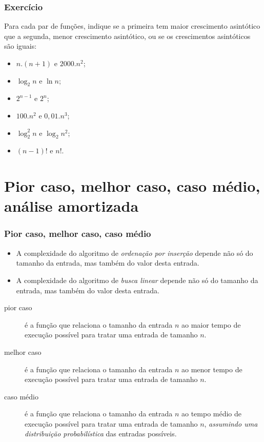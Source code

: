 \documentclass[handout]{beamer}
\begin{document}
\begin{frame}
\frametitle{Exercício}

Para cada par de funções, indique se a primeira tem maior crescimento asintótico
que a segunda, menor crescimento asintótico, ou se os crescimentos asintóticos
são iguais:
\begin{itemize}
\item $n.(n+1)$ e $2000.n^2$;
\item $\log_2 n$ e $\ln n$;
\item $2^{n-1}$ e $2^n$;
\item $100.n^2$ e $0,01.n^3$;
\item $\log_2^2 n$ e $\log_2 n^2$;
\item $(n-1)!$ e $n!$.
\end{itemize}

\end{frame}

\section{Pior caso, melhor caso, caso médio, análise amortizada}

\begin{frame}
\frametitle{Pior caso, melhor caso, caso médio}

\begin{itemize}
\item A complexidade do algoritmo de \emph{ordenação por inserção} depende não
  só do tamanho da entrada, mas também do valor desta entrada.
\item A complexidade do algoritmo de \emph{busca linear} depende não só do
  tamanho da entrada, mas também do valor desta entrada.
\end{itemize}
\pause
\begin{description}
\item[pior caso] é a função que relaciona o tamanho da entrada $n$ ao maior tempo de execução possível para tratar uma entrada de tamanho $n$.
\item[melhor caso] é a função que relaciona o tamanho da entrada $n$ ao menor tempo de execução possível para tratar uma entrada de tamanho $n$.
\item[caso médio] é a função que relaciona o tamanho da entrada $n$ ao tempo médio de execução possível para tratar uma entrada de tamanho $n$, \emph{assumindo uma distribuição probabilística} das entradas possíveis.
\end{description}
\end{frame}
\end{document}
